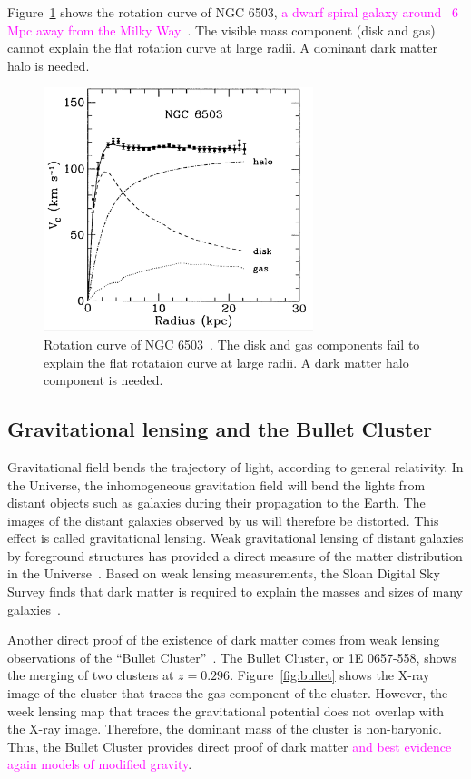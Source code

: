 \documentclass[doublespace,nopageskip]{VTthesis} %
\newcommand{\DS}[1]{\textcolor{magenta}{#1}}
\begin{document}
Figure~\ref{fig:rotation_curves} shows the rotation curve of NGC 6503, \DS{a dwarf spiral galaxy around ~6 Mpc away from the Milky Way}~\cite{1991MNRAS.249..523B}. The visible mass component (disk and gas) cannot explain the flat rotation curve at large radii. A dominant dark matter halo is needed.
\begin{figure}[htb]
    \centering
    \includegraphics[width=0.7\textwidth]{Figures/Intro/rotation_curves.eps}
    \caption{Rotation curve of NGC 6503~\cite{1991MNRAS.249..523B}. The disk and gas components fail to explain the flat rotataion curve at large radii. A dark matter halo component is needed.}
    \label{fig:rotation_curves}
\end{figure}

\subsection{Gravitational lensing and the Bullet Cluster}

Gravitational field bends the trajectory of light, according to general relativity. In the Universe, the inhomogeneous gravitation field will bend the lights from distant objects such as galaxies during their propagation to the Earth. The images of the distant galaxies observed by us will therefore be distorted. This effect is called gravitational lensing. Weak gravitational lensing of distant galaxies by foreground structures has provided a direct measure of the matter distribution in the Universe~\cite{2002NewAR..46..767H}. Based on weak lensing measurements,  the Sloan Digital Sky Survey finds that dark matter is required to explain the masses and sizes of many galaxies~\cite{2006ApJS..162...38A}.

Another direct proof of the existence of dark matter comes from weak lensing observations of the ``Bullet Cluster''~\cite{2006ApJ...648L.109C}. The Bullet Cluster, or 1E 0657-558, shows the merging of two clusters at $z=0.296$. Figure~\ref{fig:bullet} shows the X-ray image of the cluster that traces the gas component of the cluster. However, the week lensing map that traces the gravitational potential does not overlap with the X-ray image. Therefore, the dominant mass of the cluster is non-baryonic. Thus, the Bullet Cluster provides direct proof of dark matter \DS{and best evidence again models of modified gravity}.
\end{document}

